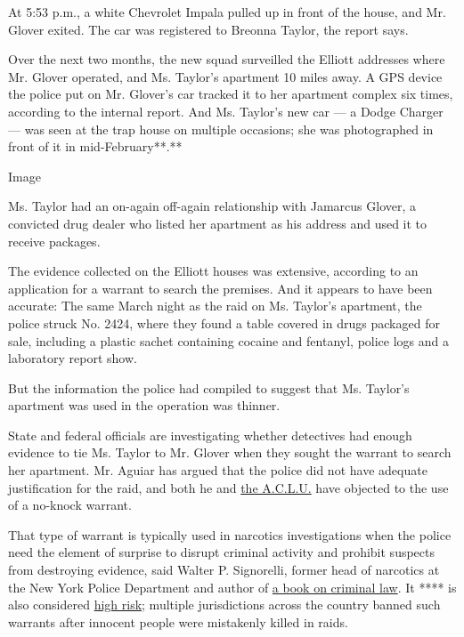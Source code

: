 At 5:53 p.m., a white Chevrolet Impala pulled up in front of the house,
and Mr. Glover exited. The car was registered to Breonna Taylor, the
report says.

Over the next two months, the new squad surveilled the Elliott addresses
where Mr. Glover operated, and Ms. Taylor's apartment 10 miles away. A
GPS device the police put on Mr. Glover's car tracked it to her
apartment complex six times, according to the internal report. And Ms.
Taylor's new car --- a Dodge Charger --- was seen at the trap house on
multiple occasions; she was photographed in front of it in
mid-February**.**

Image

Ms. Taylor had an on-again off-again relationship with Jamarcus Glover,
a convicted drug dealer who listed her apartment as his address and used
it to receive packages.

The evidence collected on the Elliott houses was extensive, according to
an application for a warrant to search the premises. And it appears to
have been accurate: The same March night as the raid on Ms. Taylor's
apartment, the police struck No. 2424, where they found a table covered
in drugs packaged for sale, including a plastic sachet containing
cocaine and fentanyl, police logs and a laboratory report show.

But the information the police had compiled to suggest that Ms. Taylor's
apartment was used in the operation was thinner.

State and federal officials are investigating whether detectives had
enough evidence to tie Ms. Taylor to Mr. Glover when they sought the
warrant to search her apartment. Mr. Aguiar has argued that the police
did not have adequate justification for the raid, and both he and
\href{https://www.whas11.com/article/news/local/no-knock-warrants-eliminate-aclu-ky/417-768ce3ae-dab8-4030-9fc6-bc271fe0a6f0}{the
A.C.L.U.} have objected to the use of a no-knock warrant.

That type of warrant is typically used in narcotics investigations when
the police need the element of surprise to disrupt criminal activity and
prohibit suspects from destroying evidence, said Walter P. Signorelli,
former head of narcotics at the New York Police Department and author of
\href{https://www.amazon.com/Criminal-Procedure-Evidence-Walter-Signorelli/dp/1439854491}{a
book on criminal law}. It **** is also considered
\href{https://www.nytimes3xbfgragh.onion/interactive/2017/03/18/us/forced-entry-warrant-drug-raid.html}{high
risk}; multiple jurisdictions across the country banned such warrants
after innocent people were mistakenly killed in raids.

